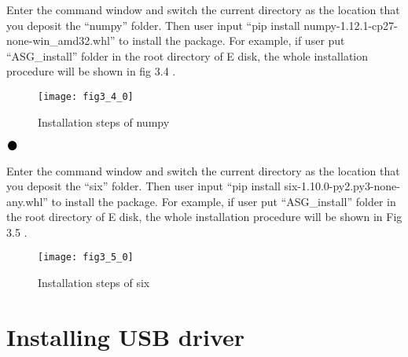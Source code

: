 Enter the command window and switch the current directory as the location that you deposit the “numpy” folder. Then user input “pip install numpy-1.12.1-cp27-none-win\_amd32.whl” to install the package. For example, if user put “ASG\_install” folder in the root directory of E disk, the whole installation procedure will be shown in fig 3.4 .
\begin{figure}[H]
\centering
\texttt{[image: fig3\_4\_0]}
\caption{Installation steps of numpy}
\end{figure}

\newpage
\noindent$\vcenter{\hbox{\huge$\bullet$}}$\quad\fontsize{12pt}{\baselineskip}\textbf{}

Enter the command window and switch the current directory as the location that you deposit the “six” folder. Then user input “pip install six-1.10.0-py2.py3-none-any.whl” to install the package. For example, if user put “ASG\_install” folder in the root directory of E disk, the whole installation procedure will be shown in Fig 3.5 .
\begin{figure}[H]
\centering
\texttt{[image: fig3\_5\_0]}
\caption{Installation steps of six}
\end{figure}

\vspace{0.8cm}
\section{\heiti Installing USB driver}

